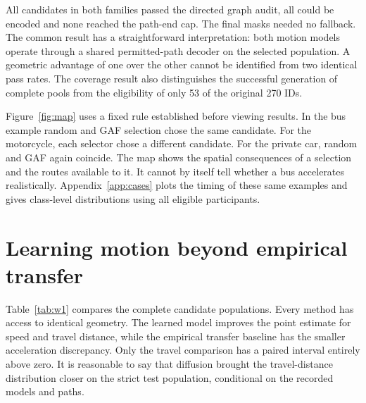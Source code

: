 All candidates in both families passed the directed graph audit, all could be encoded and none reached the path-end cap. The final masks needed no fallback. The common result has a straightforward interpretation: both motion models operate through a shared permitted-path decoder on the selected population. A geometric advantage of one over the other cannot be identified from two identical pass rates. The coverage result also distinguishes the successful generation of complete pools from the eligibility of only 53 of the original 270 IDs.

Figure~\ref{fig:map} uses a fixed rule established before viewing results. In the bus example random and GAF selection chose the same candidate. For the motorcycle, each selector chose a different candidate. For the private car, random and GAF again coincide. The map shows the spatial consequences of a selection and the routes available to it. It cannot by itself tell whether a bus accelerates realistically. Appendix~\ref{app:cases} plots the timing of these same examples and gives class-level distributions using all eligible participants.

\section{Learning motion beyond empirical transfer}
Table~\ref{tab:w1} compares the complete candidate populations. Every method has access to identical geometry. The learned model improves the point estimate for speed and travel distance, while the empirical transfer baseline has the smaller acceleration discrepancy. Only the travel comparison has a paired interval entirely above zero. It is reasonable to say that diffusion brought the travel-distance distribution closer on the strict test population, conditional on the recorded models and paths.


